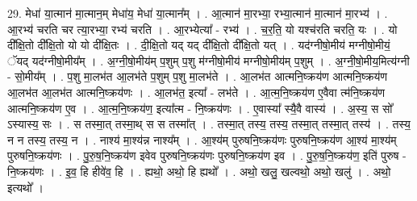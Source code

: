 \documentclass[17pt]{extarticle}
\begin{document}
29. मेधा॑ या॒त्मान॑ मा॒त्मान॒म् मेधा॑य॒ मेधा॑ या॒त्मान᳚म् । . आ॒त्मान॑ मा॒रभ्या॒ रभ्या॒त्मान॑ मा॒त्मान॑ मा॒रभ्य॑ । . आ॒रभ्य॑ चरति चर त्या॒रभ्या॒ रभ्य॑ चरति । . आ॒रभ्येत्या᳚ - रभ्य॑ । . च॒र॒ति॒ यो यश्च॑रति चरति॒ यः । . यो दी᳚क्षि॒तो दी᳚क्षि॒तो यो यो दी᳚क्षि॒तः । . दी॒क्षि॒तो यद् यद् दी᳚क्षि॒तो दी᳚क्षि॒तो यत् । . यद॑ग्नीषो॒मीय॑ मग्नीषो॒मीयं॒ ॅयद् यद॑ग्नीषो॒मीय᳚म् । . अ॒ग्नी॒षो॒मीय॑म् प॒शुम् प॒शु म॑ग्नीषो॒मीय॑ मग्नीषो॒मीय॑म् प॒शुम् । . अ॒ग्नी॒षो॒मीय॒मित्य॑ग्नी - सो॒मीय᳚म् । . प॒शु मा॒लभ॑त आ॒लभ॑ते प॒शुम् प॒शु मा॒लभ॑ते । . आ॒लभ॑त आत्मनि॒ष्क्रय॑ण आत्मनि॒ष्क्रय॑ण आ॒लभ॑त आ॒लभ॑त आत्मनि॒ष्क्रय॑णः । . आ॒लभ॑त॒ इत्या᳚ - लभ॑ते । . आ॒त्म॒नि॒ष्क्रय॑ण ए॒वैवा त्म॑नि॒ष्क्रय॑ण आत्मनि॒ष्क्रय॑ण ए॒व । . आ॒त्म॒नि॒ष्क्रय॑ण॒ इत्या᳚त्म - नि॒ष्क्रय॑णः । . ए॒वास्या᳚ स्यै॒वै वास्य॑ । . अ॒स्य॒ स सो᳚ ऽस्यास्य॒ सः । . स तस्मा॒त् तस्मा॒थ् स स तस्मा᳚त् । . तस्मा॒त् तस्य॒ तस्य॒ तस्मा॒त् तस्मा॒त् तस्य॑ । . तस्य॒ न न तस्य॒ तस्य॒ न । . नाश्य॑ मा॒श्य॑न्न नाश्य᳚म् । . आ॒श्य॑म् पुरुषनि॒ष्क्रय॑णः पुरुषनि॒ष्क्रय॑ण आ॒श्य॑ मा॒श्य॑म् पुरुषनि॒ष्क्रय॑णः । . पु॒रु॒ष॒नि॒ष्क्रय॑ण इवेव पुरुषनि॒ष्क्रय॑णः पुरुषनि॒ष्क्रय॑ण इव । . पु॒रु॒ष॒नि॒ष्क्रय॑ण॒ इति॑ पुरुष - नि॒ष्क्रय॑णः । . इ॒व॒ हि हीवे॑व॒ हि । . ह्यथो॒ अथो॒ हि ह्यथो᳚ । . अथो॒ खलु॒ खल्वथो॒ अथो॒ खलु॑ । . अथो॒ इत्यथो᳚ । \newline
\end{document}
